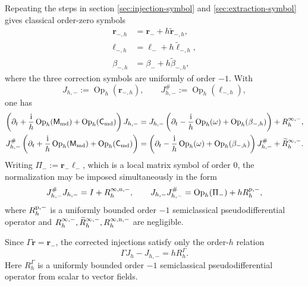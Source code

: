 \documentclass[11pt,reqno]{amsart}
\newcommand{\ii}{\mathrm{i}}
\newcommand{\Op}{\operatorname{Op}}
\numberwithin{equation}{section}
\begin{document}
Repeating the steps in section \ref{sec:injection-symbol} and \ref{sec:extraction-symbol} gives classical order-zero symbols
\begin{equation}\label{eq:full-negative-mode-symbols}
 \begin{aligned}
 \bm r_{-,h}&=\bm r_-+h\widetilde{\bm r}_{-,h},\\
 \bm\ell_{-,h}&=\bm\ell_-+h\widetilde{\bm\ell}_{-,h},\\
 \beta_{-,h}&=\beta_-+h\widetilde\beta_{-,h},
 \end{aligned}
\end{equation}
where the three correction symbols are uniformly of order $-1$. With
\begin{equation*}
 J_{h,-}:=\Op_h(\bm r_{-,h}), \qquad J_{h,-}^{\#}:=\Op_h(\bm\ell_{-,h}),
\end{equation*}
one has
\begin{align}
 \left(\partial_t+\frac{\ii}{h}\Op_h(\mathsf M_{\rm md})+\Op_h(\mathsf C_{\rm md})\right)J_{h,-}
 &=J_{h,-}\left(\partial_t-\frac{\ii}{h}\Op_h(\omega)+\Op_h(\beta_{-,h})\right)
 +R_h^{\infty,-},
 \label{eq:negative-intertwine-relation}\\
 J_{h,-}^{\#}\left(\partial_t+\frac{\ii}{h}\Op_h(\mathsf M_{\rm md})+\Op_h(\mathsf C_{\rm md})\right)
 &=\left(\partial_t-\frac{\ii}{h}\Op_h(\omega)+\Op_h(\beta_{-,h})\right)
 J_{h,-}^{\#}+\widetilde R_h^{\infty,-}.
 \label{eq:negative-left-intertwine-relation}
\end{align}
Writing $\Pi_-:=\bm r_-\bm\ell_-$, which is a local matrix symbol of order $0$, the normalization may be imposed simultaneously in the form
\begin{equation*}
 J_{h,-}^{\#}J_{h,-}=I+R_h^{\infty,{\rm n},-}, \qquad J_{h,-}J_{h,-}^{\#}=\Op_h(\Pi_-)+hR_h^{{\rm p},-},
\end{equation*}
where $R_h^{{\rm p},-}$ is a uniformly bounded order $-1$ semiclassical pseudodifferential operator and $R_h^{\infty,-}, \widetilde R_h^{\infty,-}, R_h^{\infty,{\rm n},-}$ are negligible.

Since $\Gamma\bm r=\bm r_-$, the corrected injections satisfy only the order-$h$ relation
\begin{equation*}
 \Gamma J_h-J_{h,-}=hR_h^\Gamma.
\end{equation*}
Here $R_h^\Gamma$ is a uniformly bounded order $-1$ semiclassical pseudodifferential operator from scalar to vector fields.
\end{document}
